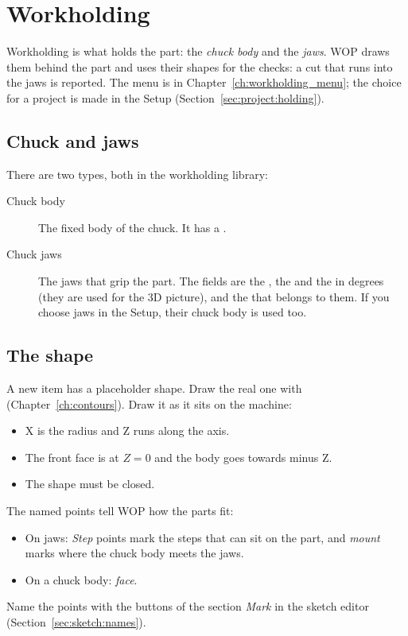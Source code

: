\chapter{Workholding}\label{ch:workholding}

Workholding is what holds the part: the \emph{chuck body} and the \emph{jaws}. WOP draws them behind the part and uses their shapes for the checks: a cut that runs into the jaws is reported. The menu is in Chapter~\ref{ch:workholding_menu}; the choice for a project is made in the Setup (Section~\ref{sec:project:holding}).

\section{Chuck and jaws}
There are two types, both in the workholding library:
\begin{description}
\item[Chuck body] The fixed body of the chuck. It has a .
\item[Chuck jaws] The jaws that grip the part. The fields are the , the  and the  in degrees (they are used for the 3D picture), and the  that belongs to them. If you choose jaws in the Setup, their chuck body is used too.
\end{description}

\section{The shape}\label{sec:workholding:shape}
A new item has a placeholder shape. Draw the real one with  (Chapter~\ref{ch:contours}). Draw it as it sits on the machine:
\begin{itemize}
  \item X is the radius and Z runs along the axis.
  \item The front face is at $Z=0$ and the body goes towards minus Z.
  \item The shape must be closed.
\end{itemize}
The named points tell WOP how the parts fit:
\begin{itemize}
  \item On jaws: \emph{Step} points mark the steps that can sit on the part, and \emph{mount} marks where the chuck body meets the jaws.
  \item On a chuck body: \emph{face}.
\end{itemize}
Name the points with the buttons of the section \emph{Mark} in the sketch editor (Section~\ref{sec:sketch:names}).

